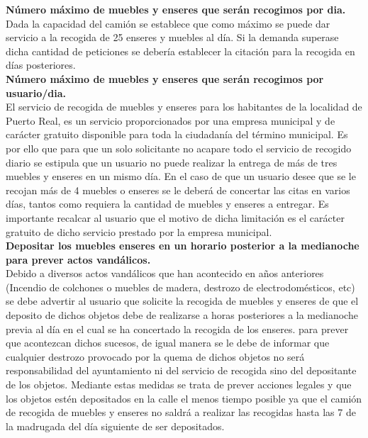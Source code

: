 \textbf{Número máximo de muebles y enseres que serán recogimos por dia.} \\
Dada la capacidad del camión se establece que como máximo se puede dar servicio a la recogida de 25 enseres y muebles al día. Si la demanda superase dicha cantidad de peticiones se debería establecer la citación para la recogida en días posteriores. \\

\textbf{Número máximo de muebles y enseres que serán recogimos por usuario/dia.} \\
El servicio de recogida de muebles y enseres para los habitantes de la localidad de Puerto Real, es un servicio proporcionados por una empresa municipal y de carácter gratuito disponible para toda la ciudadanía del término municipal. Es por ello que para que un solo solicitante no acapare todo el servicio de recogido diario se estipula que un usuario no puede realizar la entrega de más de tres muebles y enseres en un mismo día. En el caso de que un usuario desee que se le recojan más de 4 muebles o enseres se le deberá de concertar las citas en varios días, tantos como requiera la cantidad de muebles y enseres a entregar. Es importante recalcar al usuario que el motivo de dicha limitación es el carácter gratuito de dicho servicio prestado por la empresa municipal. \\

\textbf{Depositar los muebles enseres en un horario posterior a la medianoche para prever actos vandálicos.} \\
Debido a diversos actos vandálicos que han acontecido en años anteriores (Incendio de colchones o muebles de madera, destrozo de electrodomésticos, etc) se debe advertir al usuario que solicite la recogida de muebles y enseres de que el deposito de dichos objetos debe de realizarse a horas posteriores a la medianoche previa al día en el cual se ha concertado la recogida de los enseres. para prever que acontezcan dichos sucesos, de igual manera se le debe de informar que cualquier destrozo provocado por la quema de dichos objetos no será responsabilidad del ayuntamiento ni del servicio de recogida sino del depositante de los objetos. Mediante estas medidas se trata de prever acciones legales y  que los objetos estén depositados en la calle el menos tiempo posible ya que el camión de recogida de muebles y enseres no saldrá a realizar las recogidas hasta las 7 de la madrugada del día siguiente de ser depositados. \\

